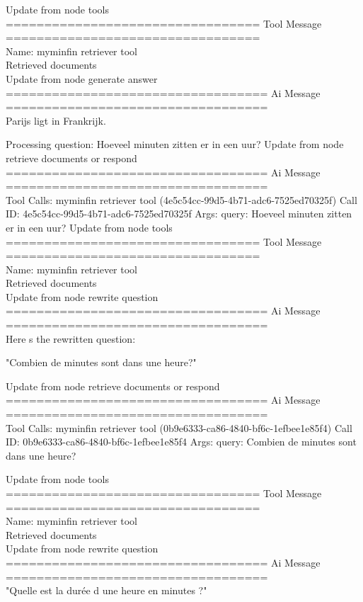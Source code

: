 Update from node tools
\\[1em]
================================= Tool Message =================================
\\[1em]
Name: myminfin retriever tool
\\[1em]
Retrieved documents
\\[1em]
Update from node generate answer
\\[1em]
================================== Ai Message ==================================
\\[1em]
Parijs ligt in Frankrijk.


Processing question: Hoeveel minuten zitten er in een uur?
Update from node retrieve documents or respond
\\[1em]
================================== Ai Message ==================================
\\[1em]
Tool Calls:
myminfin retriever tool (4e5c54cc-99d5-4b71-adc6-7525ed70325f)
Call ID: 4e5c54cc-99d5-4b71-adc6-7525ed70325f
Args:
query: Hoeveel minuten zitten er in een uur?
Update from node tools
\\[1em]
================================= Tool Message =================================
\\[1em]
Name: myminfin retriever tool
\\[1em]
Retrieved documents
\\[1em]
Update from node rewrite question
\\[1em]
================================== Ai Message ==================================
\\[1em]
Here s the rewritten question:

"Combien de minutes sont dans une heure?"

Update from node retrieve documents or respond
\\[1em]
================================== Ai Message ==================================
\\[1em]
Tool Calls:
myminfin retriever tool (0b9e6333-ca86-4840-bf6c-1efbee1e85f4)
Call ID: 0b9e6333-ca86-4840-bf6c-1efbee1e85f4
Args:
query: Combien de minutes sont dans une heure?

Update from node tools
\\[1em]
================================= Tool Message =================================
\\[1em]
Name: myminfin retriever tool
\\[1em]
Retrieved documents
\\[1em]
Update from node rewrite question
\\[1em]
================================== Ai Message ==================================
\\[1em]
"Quelle est la durée d une heure en minutes ?"


